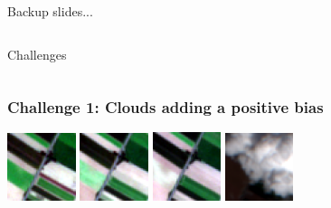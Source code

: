 \documentclass[%
  aspectratio=169,
  9pt,
  USenglish,
  titlegraphic, %
  affiliationintitlepagehead,
  affiliation,
]{beamer}
\begin{document}
{
	\begin{frame}[plain]
	
	\vfill
	\Huge\color{white}
	\begin{center}
		\begin{columns}
			\vspace{7em}
			
			\hfill 
			Backup slides...
			
		\end{columns}
	\end{center}
	
	\vfill
\end{frame}
}


{
	\begin{frame}[plain]
	
	\vfill
	\Huge\color{white}
	\begin{center}
		\begin{columns}
			\column{.5\textwidth}
			\vspace{7em}
			
			\hfill 
			Challenges
			\column{.5\textwidth}
			
		\end{columns}
	\end{center}
	
	\vfill
\end{frame}
}



\begin{frame}
\frametitle{Challenge 1: Clouds adding a positive bias}

\includegraphics[width=2cm]{images/s2grid/1}
\includegraphics[width=2cm]{images/s2grid/2}
\includegraphics[width=2cm]{images/s2grid/3}
\includegraphics[width=2cm]{images/s2grid/4}

%
\examplecorn

\end{frame}
\end{document}
